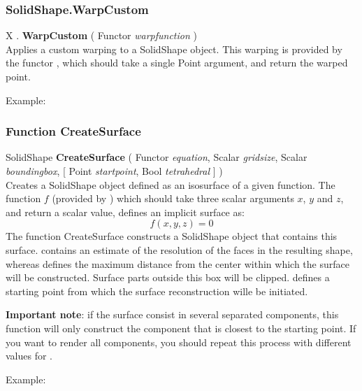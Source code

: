 \subsubsection{SolidShape.WarpCustom \label{F:SolidShape:WarpCustom}}
X . \textbf{WarpCustom} ( Functor \textit{warpfunction} ) \\
Applies a custom warping to a SolidShape object. This warping is provided by the functor , which should take a single Point argument, and return the warped point.

Example: \\

\subsubsection{Function CreateSurface \label{F:CreateSurface}}
SolidShape \textbf{CreateSurface} ( Functor \textit{equation}, Scalar \textit{gridsize}, Scalar \textit{boundingbox},  [ Point \textit{startpoint}, Bool \textit{tetrahedral} ] ) \\
Creates a SolidShape object defined as an isosurface of a given function. The function $f$ (provided by ) which should take three scalar arguments $x$, $y$ and $z$, and return a scalar value, defines an implicit surface as:
\begin{equation}
f(x,y,z)=0
\end{equation}
The function CreateSurface constructs a SolidShape object that contains this surface.  contains an estimate of the resolution of the faces in the resulting shape, whereas  defines the maximum distance from the center within which the surface will be constructed. Surface parts outside this box will be clipped.  defines a starting point from which the surface reconstruction wille be initiated.

\textbf{Important note}: if the surface consist in several separated components, this function will only construct the component that is closest to the starting point. If you want to render all components, you should repeat this process with different values for .

Example: \\

